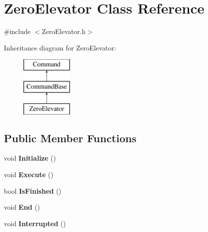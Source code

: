 \hypertarget{class_zero_elevator}{}\section{Zero\+Elevator Class Reference}
\label{class_zero_elevator}


{\ttfamily \#include $<$Zero\+Elevator.\+h$>$}

Inheritance diagram for Zero\+Elevator\+:\begin{figure}[H]
\begin{center}
\leavevmode
\includegraphics[height=3.000000cm]{class_zero_elevator}
\end{center}
\end{figure}
\subsection*{Public Member Functions}
\begin{DoxyCompactItemize}
\item 
\hypertarget{class_zero_elevator_ade49af7baca93f2819bf15e5d0c28755}{}void {\bfseries Initialize} ()\label{class_zero_elevator_ade49af7baca93f2819bf15e5d0c28755}

\item 
\hypertarget{class_zero_elevator_a302a2c64707964aaa8ed8553dc23b096}{}void {\bfseries Execute} ()\label{class_zero_elevator_a302a2c64707964aaa8ed8553dc23b096}

\item 
\hypertarget{class_zero_elevator_aff4d8ad330e0001ca86a32feb522c9aa}{}bool {\bfseries Is\+Finished} ()\label{class_zero_elevator_aff4d8ad330e0001ca86a32feb522c9aa}

\item 
\hypertarget{class_zero_elevator_a517f0fb6bde77a9558f718556318efb5}{}void {\bfseries End} ()\label{class_zero_elevator_a517f0fb6bde77a9558f718556318efb5}

\item 
\hypertarget{class_zero_elevator_a53b34d8628da07dc943ea634c4192f98}{}void {\bfseries Interrupted} ()\label{class_zero_elevator_a53b34d8628da07dc943ea634c4192f98}

\end{DoxyCompactItemize}
